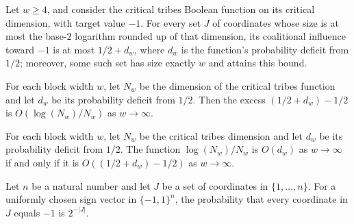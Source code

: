 \begin{theorem}
\label{FABL.criticalTribes_towardTrue_max_clog_exact}
\leanok
{}
Let $w\ge 4$, and consider the critical tribes Boolean function on its critical
dimension, with target value $-1$. For every set $J$ of coordinates whose size is at
most the base-$2$ logarithm rounded up of that dimension, its coalitional influence
toward $-1$ is at most $1/2+d_w$, where $d_w$ is the function's probability deficit from
$1/2$; moreover, some such set has size exactly $w$ and attains this bound.
\end{theorem}

\begin{theorem}
\label{FABL.criticalTribes_towardTrue_excess_isBigO}
\leanok
{}
For each block width $w$, let $N_w$ be the dimension of the critical tribes function and
let $d_w$ be its probability deficit from $1/2$. Then the excess $(1/2+d_w)-1/2$ is
$O\!\left(\log(N_w)/N_w\right)$ as $w\to\infty$.
\end{theorem}

\begin{theorem}
\label{FABL.criticalTribes_towardTrue_omega_iff_deficit_omega}
\leanok
{}
For each block width $w$, let $N_w$ be the critical tribes dimension and let $d_w$ be
its probability deficit from $1/2$. The function $\log(N_w)/N_w$ is $O(d_w)$ as
$w\to\infty$ if and only if it is $O((1/2+d_w)-1/2)$ as $w\to\infty$.
\end{theorem}

\begin{theorem}
\label{FABL.uniformProbability_all_neg_one_on_finset}
\leanok
{}
Let $n$ be a natural number and let $J$ be a set of coordinates in $\{1,\ldots,n\}$. For
a uniformly chosen sign vector in $\{-1,1\}^n$, the probability that every coordinate in
$J$ equals $-1$ is $2^{-|J|}$.
\end{theorem}

